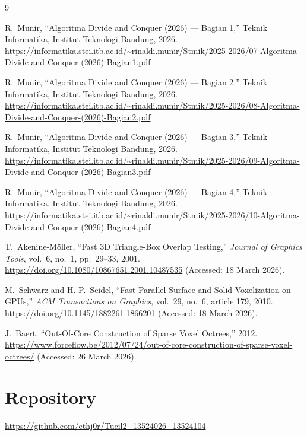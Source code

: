 \documentclass[11pt,a4paper]{article}
\begin{document}
\begin{thebibliography}{9}

R.~Munir, ``Algoritma Divide and Conquer (2026) --- Bagian 1,''
Teknik Informatika, Institut Teknologi Bandung, 2026.
\url{https://informatika.stei.itb.ac.id/~rinaldi.munir/Stmik/2025-2026/07-Algoritma-Divide-and-Conquer-(2026)-Bagian1.pdf}

R.~Munir, ``Algoritma Divide and Conquer (2026) --- Bagian 2,''
Teknik Informatika, Institut Teknologi Bandung, 2026.
\url{https://informatika.stei.itb.ac.id/~rinaldi.munir/Stmik/2025-2026/08-Algoritma-Divide-and-Conquer-(2026)-Bagian2.pdf}

R.~Munir, ``Algoritma Divide and Conquer (2026) --- Bagian 3,''
Teknik Informatika, Institut Teknologi Bandung, 2026.
\url{https://informatika.stei.itb.ac.id/~rinaldi.munir/Stmik/2025-2026/09-Algoritma-Divide-and-Conquer-(2026)-Bagian3.pdf}

R.~Munir, ``Algoritma Divide and Conquer (2026) --- Bagian 4,''
Teknik Informatika, Institut Teknologi Bandung, 2026.
\url{https://informatika.stei.itb.ac.id/~rinaldi.munir/Stmik/2025-2026/10-Algoritma-Divide-and-Conquer-(2026)-Bagian4.pdf}

T.~Akenine-M\"oller, ``Fast 3D Triangle-Box Overlap Testing,''
\textit{Journal of Graphics Tools}, vol.~6, no.~1, pp.~29--33, 2001.
\url{https://doi.org/10.1080/10867651.2001.10487535}
(Accessed: 18 March 2026).

M.~Schwarz and H.-P.~Seidel, ``Fast Parallel Surface and Solid Voxelization on GPUs,''
\textit{ACM Transactions on Graphics}, vol.~29, no.~6, article 179, 2010.
\url{https://doi.org/10.1145/1882261.1866201}
(Accessed: 18 March 2026).

J.~Baert, ``Out-Of-Core Construction of Sparse Voxel Octrees,'' 2012.
\url{https://www.forceflow.be/2012/07/24/out-of-core-construction-of-sparse-voxel-octrees/}
(Accessed: 26 March 2026).

\end{thebibliography}

\newpage
\section*{Repository}

\url{https://github.com/ethj0r/Tucil2_13524026_13524104}
\end{document}
